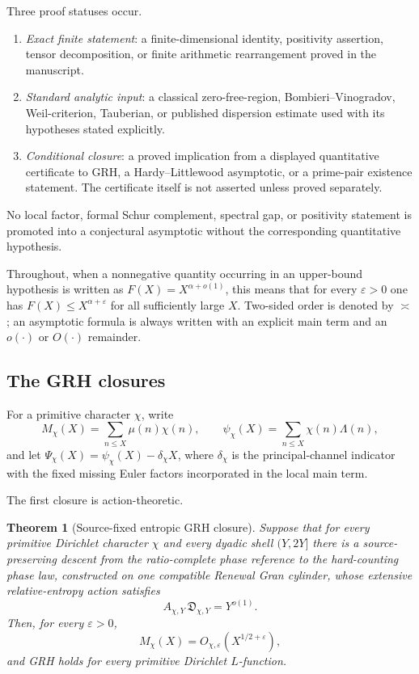 \documentclass[11pt]{article}
\newtheorem{theorem}{Theorem}[section]
\theoremstyle{definition}
\theoremstyle{remark}
\begin{document}
Three proof statuses occur.
\begin{enumerate}[label=\textup{(S\arabic*)},leftmargin=3.2em]
\item \emph{Exact finite statement}: a finite-dimensional identity, positivity
      assertion, tensor decomposition, or finite arithmetic rearrangement
      proved in the manuscript.
\item \emph{Standard analytic input}: a classical zero-free-region,
      Bombieri--Vinogradov, Weil-criterion, Tauberian, or published dispersion
      estimate used with its hypotheses stated explicitly.
\item \emph{Conditional closure}: a proved implication from a displayed
      quantitative certificate to GRH, a Hardy--Littlewood asymptotic, or a
      prime-pair existence statement.  The certificate itself is not asserted
      unless proved separately.
\end{enumerate}
No local factor, formal Schur complement, spectral gap, or positivity statement
is promoted into a conjectural asymptotic without the corresponding
quantitative hypothesis.

Throughout, when a nonnegative quantity occurring in an upper-bound hypothesis
is written as $F(X)=X^{\alpha+o(1)}$, this means that for every $\varepsilon>0$
one has $F(X)\le X^{\alpha+\varepsilon}$ for all sufficiently large $X$.
Two-sided order is denoted by $\asymp$; an asymptotic formula is always written
with an explicit main term and an $o(\cdot)$ or $O(\cdot)$ remainder.

\subsection{The GRH closures}

For a primitive character $\chi$, write
\[
 M_\chi(X)=\sum_{n\le X}\mu(n)\chi(n),
 \qquad
 \psi_\chi(X)=\sum_{n\le X}\chi(n)\Lambda(n),
\]
and let $\Psi_\chi(X)=\psi_\chi(X)-\delta_\chi X$, where
$\delta_\chi$ is the principal-channel indicator with the fixed missing Euler
factors incorporated in the local main term.

The first closure is action-theoretic.

\begin{theorem}[Source-fixed entropic GRH closure]
\label{thm:intro-entropic-GRH}
Suppose that for every primitive Dirichlet character $\chi$ and every dyadic
shell $(Y,2Y]$ there is a source-preserving descent from the ratio-complete
phase reference to the hard-counting phase law, constructed on one compatible
Renewal Gran cylinder, whose extensive relative-entropy action satisfies
\[
 A_{\chi,Y}\,\mathfrak D_{\chi,Y}=Y^{o(1)}.
\]
Then, for every $\varepsilon>0$,
\[
 M_\chi(X)=O_{\chi,\varepsilon}(X^{1/2+\varepsilon}),
\]
and GRH holds for every primitive Dirichlet $L$-function.
\end{theorem}
\end{document}
